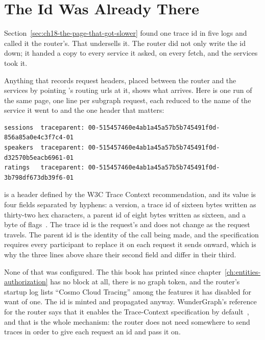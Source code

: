\section{The Id Was Already There}
\label{sec:ch18-the-id-was-already-there}

%
Section~\ref{sec:ch18-the-page-that-got-slower} found one trace id in five logs
and called it the router's. That undersells it. The router did not only write
the id down; it handed a copy to every service it asked, on every fetch, and
the services took it.

%
Anything that records request headers, placed between the router and the
services by pointing 's routing urls at it, shows what
arrives. Here is one run of the same page, one line per subgraph request, each
reduced to the name of the service it went to and the one header that
matters:

\begin{verbatim}
sessions  traceparent: 00-515457460e4ab1a45a57b5b745491f0d-856a85a0e4c3f7c4-01
speakers  traceparent: 00-515457460e4ab1a45a57b5b745491f0d-d32570b5eacb6961-01
ratings   traceparent: 00-515457460e4ab1a45a57b5b745491f0d-3b798df673db39f6-01
\end{verbatim}

%
 is a header defined by the W3C Trace Context recommendation,
and its value is four fields separated by hyphens: a version, a trace id of
sixteen bytes written as thirty-two hex characters, a parent id of eight bytes
written as sixteen, and a byte of flags~\autocite{w3ctracecontext}. The trace
id is the request's and does not change as the request travels. The parent id
is the identity of the call being made, and the specification requires every
participant to replace it on each request it sends onward, which is why the
three lines above share their second field and differ in their third.

%
None of that was configured. The  this book has printed since
chapter~\ref{ch:entities-authorization} has no  block at all,
there is no graph token, and the router's startup log lists
\enquote{Cosmo Cloud Tracing} among the features it has disabled for want of
one. The id is minted and propagated anyway. WunderGraph's reference for the
router says that it enables the Trace-Context specification by
default~\autocite{cosmotelemetry}, and that is the whole mechanism: the router
does not need somewhere to send traces in order to give each request an id and
pass it on.

